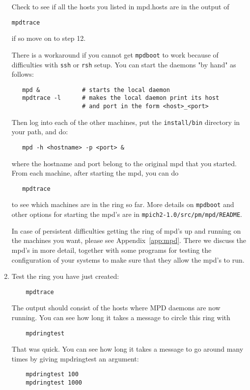 \documentclass[dvipdfm,11pt]{article}
\begin{document}
\begin{enumerate}
Check to see if all the hosts you listed in mpd.hosts are in the output
of 
\begin{verbatim}
mpdtrace
\end{verbatim}
if so move on to step 12.

There is a workaround if you cannot get \texttt{mpdboot} to work because of
difficulties with \texttt{ssh} or \texttt{rsh} setup.  You can start the daemons "by
hand" as follows:
\begin{verbatim}
   mpd &            # starts the local daemon
   mpdtrace -l      # makes the local daemon print its host
                    # and port in the form <host>_<port>
\end{verbatim}
Then log into each of the other machines, put the \texttt{install/bin}
directory in your path, and do:
\begin{verbatim}
   mpd -h <hostname> -p <port> &
\end{verbatim}
where the hostname and port belong to the original mpd that you
started.  From each machine, after starting the mpd, you can do 
\begin{verbatim}
   mpdtrace
\end{verbatim}
to see which machines are in the ring so far.  More details on
\texttt{mpdboot} and other options for starting the mpd's are in
\texttt{mpich2-1.0/src/pm/mpd/README}.

In case of persistent difficulties getting the ring of mpd's up and
running on the machines you want, please see Appendix~\ref{app:mpd}.
There we discuss the mpd's in more detail, together with some programs
for testing the configuration of your systems to make sure that they
allow the mpd's to run.

\item
Test the ring you have just created:
\begin{verbatim}
    mpdtrace
\end{verbatim}
The output should consist of the hosts where MPD daemons are now
running.  You can see how long it takes a message to circle this
ring with 
\begin{verbatim}
    mpdringtest
\end{verbatim}
That was quick.  You can see how long it takes a message to go
around many times by giving mpdringtest an argument:
\begin{verbatim}
    mpdringtest 100
    mpdringtest 1000
\end{verbatim}


\end{enumerate}
\end{document}
